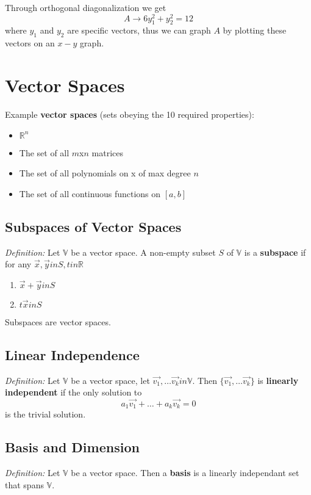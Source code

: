 \documentclass[12pt]{article}
\newcommand{\R}[1]{\mathbb{R}^{#1}}
\begin{document}
Through orthogonal diagonalization we get \[ A \to 6y_1^2 + y_2^2 = 12 \] where $y_1$ and $y_2$ are specific vectors, thus we can graph $A$ by plotting these vectors on an $x-y$ graph.

\section*{Vector Spaces}
Example {\bf vector spaces} (sets obeying the 10 required properties):
\begin{itemize}
\item $\R{n}$
\item The set of all $m$x$n$ matrices
\item The set of all polynomials on x of max degree $n$
\item The set of all continuous functions on $[a,b]$
\end{itemize}

\subsection*{Subspaces of Vector Spaces}
\textit{Definition:} Let $\mathbb{V}$ be a vector space. A non-empty subset $S$ of $\mathbb{V}$ is a {\bf subspace} if for any $\vec{x}, \vec{y} in S, t in \mathbb{R}$
\begin{enumerate}
\item $\vec{x} + \vec{y} in S$
\item $t\vec{x} in S$
\end{enumerate}

Subspaces are vector spaces.


\subsection*{Linear Independence}
\textit{Definition:} Let $\mathbb{V}$ be a vector space, let $\vec{v_1},\dots \vec{v_k} in \mathbb{V}$. Then $\{\vec{v_1},\dots \vec{v_k}\}$ is {\bf linearly independent} if the only solution to \[ a_1\vec{v_1} + \dots + a_k\vec{v_k} = 0 \] is the trivial solution.

\subsection*{Basis and Dimension}
\textit{Definition:} Let $\mathbb{V}$ be a vector space. Then a {\bf basis} is a linearly independant set that spans $\mathbb{V}$.
\end{document}
